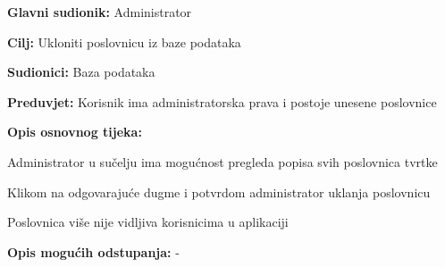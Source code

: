 					\noindent {}
					\begin{packed_item}
	
						\item \textbf{Glavni sudionik: }Administrator
						\item  \textbf{Cilj: }Ukloniti poslovnicu iz baze podataka
						\item  \textbf{Sudionici: }Baza podataka
						\item  \textbf{Preduvjet: }Korisnik ima administratorska prava i postoje unesene poslovnice
						\item  \textbf{Opis osnovnog tijeka:}
						
						\item[] \begin{packed_enum}
							\item Administrator u sučelju ima mogućnost pregleda popisa svih poslovnica tvrtke
							\item Klikom na odgovarajuće dugme i potvrdom administrator uklanja poslovnicu
							\item Poslovnica više nije vidljiva korisnicima u aplikaciji
						\end{packed_enum}
						
						\item  \textbf{Opis mogućih odstupanja: }-
					\end{packed_item}
					
